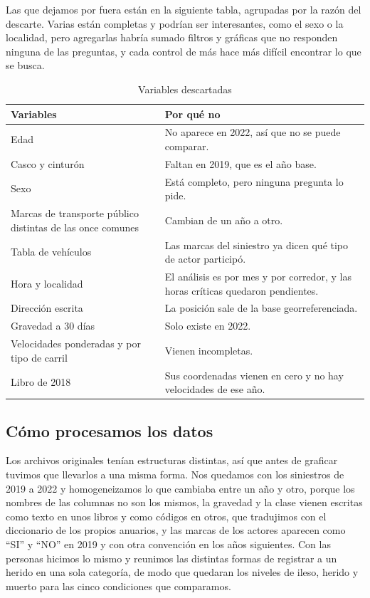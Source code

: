 \documentclass[10pt,a4paper]{article}
\begin{document}
Las que dejamos por fuera están en la siguiente tabla, agrupadas por la razón del descarte. Varias están completas y podrían ser interesantes, como el sexo o la localidad, pero agregarlas habría sumado filtros y gráficas que no responden ninguna de las preguntas, y cada control de más hace más difícil encontrar lo que se busca.

\begin{table}[H]\centering\small
\begin{tabularx}{\linewidth}{P{5.6cm}L}
\toprule
\textbf{Variables} & \textbf{Por qué no}\\
\midrule
Edad & No aparece en 2022, así que no se puede comparar.\\
Casco y cinturón & Faltan en 2019, que es el año base.\\
Sexo & Está completo, pero ninguna pregunta lo pide.\\
Marcas de transporte público distintas de las once comunes & Cambian de un año a otro.\\
Tabla de vehículos & Las marcas del siniestro ya dicen qué tipo de actor participó.\\
Hora y localidad & El análisis es por mes y por corredor, y las horas críticas quedaron pendientes.\\
Dirección escrita & La posición sale de la base georreferenciada.\\
Gravedad a 30 días & Solo existe en 2022.\\
Velocidades ponderadas y por tipo de carril & Vienen incompletas.\\
Libro de 2018 & Sus coordenadas vienen en cero y no hay velocidades de ese año.\\
\bottomrule
\end{tabularx}
\caption{Variables descartadas}
\end{table}

\subsection{Cómo procesamos los datos}

Los archivos originales tenían estructuras distintas, así que antes de graficar tuvimos que llevarlos a una misma forma. Nos quedamos con los siniestros de 2019 a 2022 y homogeneizamos lo que cambiaba entre un año y otro, porque los nombres de las columnas no son los mismos, la gravedad y la clase vienen escritas como texto en unos libros y como códigos en otros, que tradujimos con el diccionario de los propios anuarios, y las marcas de los actores aparecen como ``SI'' y ``NO'' en 2019 y con otra convención en los años siguientes. Con las personas hicimos lo mismo y reunimos las distintas formas de registrar a un herido en una sola categoría, de modo que quedaran los niveles de ileso, herido y muerto para las cinco condiciones que comparamos.
\end{document}
